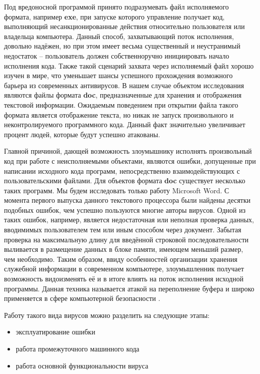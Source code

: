 Под вредоносной программой принято подразумевать файл исполняемого формата, например \textbf{exe}, при запуске которого управление получает код, выполняющий несанкционированные действия относительно пользователя или владельца компьютера. 
Данный способ, захватывающий поток исполнения, довольно надёжен, но при этом имеет весьма существенный и неустранимый недостаток -- пользователь должен собственноручно инициировать начало исполнения кода.
Также такой сценарий захвата через исполняемый файл хорошо изучен в мире, что уменьшает шансы успешного прохождения возможного барьера из современных антивирусов.
В нашем случае объектом исследования являются файлы формата \textbf{doc}, предназначенные для хранения и отображения текстовой информации. 
Ожидаемым поведением при открытии файла такого формата является отображение текста, но никак не запуск произвольного и неконтролируемого программного кода.
Данный факт значительно увеличивает процент людей, которые будут успешно атакованы.

Главной причиной, дающей возможность злоумышнику исполнять произвольный код при работе с неисполняемыми объектами, являются ошибки, допущенные при написании исходного кода программ, непосредственно взаимодействующих с пользовательскими файлами. 
Для объектов формата \textbf{doc} существует несколько таких программ.
Мы будем исследовать только работу Microsoft Word.
С момента первого выпуска данного текстового процессора были найдены десятки подобных ошибок, чем успешно пользуются многие авторы вирусов.
Одной из таких ошибок, например, является недостаточная или неполная проверка данных, вводимимых пользователем тем или иным способом через документ.
Забытая проверка на максимальную длину для введённой строковой последовательности выливается в размещение данных в блоке памяти, имеющем меньший размер, чем необходимо. 
Таким образом, ввиду особенностей организации хранения служебной информации в современном компьютере, злоумышленник получает возможность видоизменять её и в итоге влиять на поток исполнения исходной программы. 
Данная техника называется атакой на переполнение буфера и широко применяется в сфере компьютерной безопасности \cite{owasp_bo}.

Работу такого вида вирусов можно разделить на следующие этапы:

\begin{itemize}
\item эксплуатирование ошибки
\item работа промежуточного машинного кода
\item работа основной функциональности вируса
\end{itemize}

